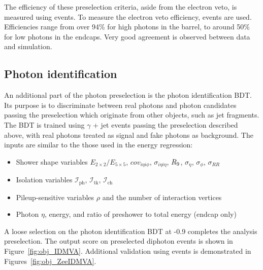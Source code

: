 The efficiency of these preselection criteria, aside from the electron veto, is measured using \Zee events.
To measure the electron veto efficiency, \Zmumug events are used.
Efficiencies range from over 94\% for high \RNINE photons in the barrel, 
to around 50\% for low \RNINE photons in the endcaps.
Very good agreement is observed between data and simulation. %

\subsection{Photon identification}

An additional part of the photon preselection is the photon identification BDT.
Its purpose is to discriminate between real photons and photon candidates passing the preselection which originate from other objects, 
such as jet fragments.
The BDT is trained using $\gamma$ + jet events passing the preselection described above, with real photons treated as signal and fake photons as background.
The inputs are similar to the those used in the energy regression:
\begin{itemize}
  \item Shower shape variables $E_{2\times2}/E_{5\times5}$, $cov_{i\eta i\phi}$, $\sigma_{i\eta i\eta}$, $R_9$, $\sigma_{\eta}$, $\sigma_{\phi}$, $\sigma_{RR}$
  \item Isolation variables $\mathcal{I}_{\text{ph}}$, $\mathcal{I}_{\text{tk}}$, $\mathcal{I}_{\text{ch}}$
  \item Pileup-sensitive variables $\rho$ and the number of interaction vertices
  \item Photon $\eta$, energy, and ratio of preshower to total energy (endcap only)
\end{itemize}

A loose selection on the photon identification BDT at -0.9 completes the analysis preselection.
The output score on preselected diphoton events is shown in Figure~\ref{fig:obj_IDMVA}.
Additional validation using \Zee events is demonstrated in Figures~\ref{fig:obj_ZeeIDMVA}.

